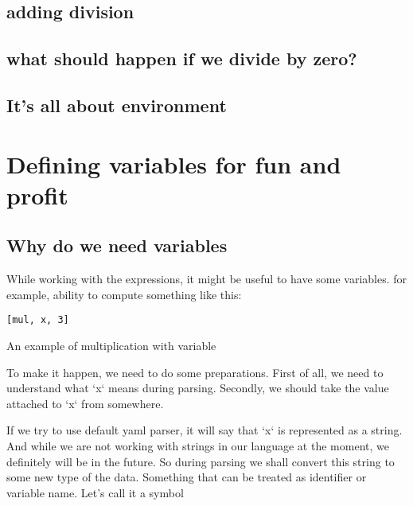 \documentclass[11pt]{article}
\begin{document}
\subsection{adding division}
\label{sec:org5e5fc35}
\subsection{what should happen if we divide by zero?}
\label{sec:orgdb77a97}
\subsection{It's all about environment}
\label{sec:org1e5bcbc}
\section{Defining variables for fun and profit}
\label{sec:orgaeacd10}
\subsection{Why do we need variables}
\label{sec:orgd4e8c2c}
While working with the expressions, it might be useful to have some variables.
for example, ability to compute something like this:
\begin{listing}[htbp]
\begin{verbatim}
[mul, x, 3]
\end{verbatim}
\caption{An example of multiplication with variable}
\end{listing}
To make it happen, we need to do some preparations.
First of all, we need to understand what `x` means during parsing.
Secondly, we should take the value attached to `x` from somewhere.

If we try to use default yaml parser, it will say that `x` is represented as a string.
And while we are not working with strings in our language at the moment, we definitely will be in the future.
So during parsing we shall convert this string to some new type of the data.
Something that can be treated as identifier or variable name. Let's call it a symbol
\end{document}

